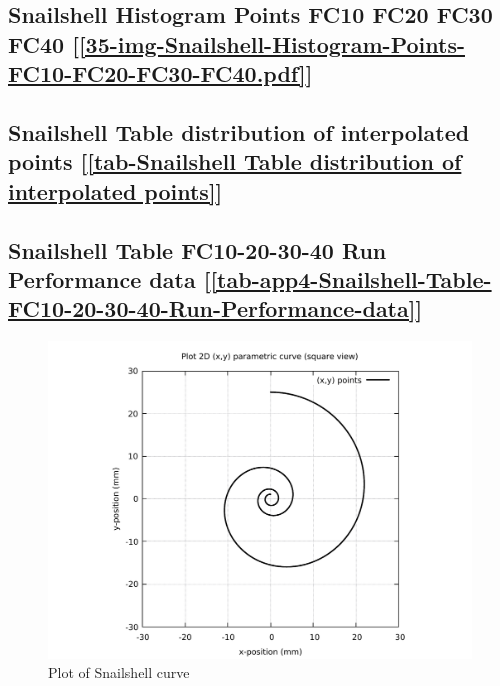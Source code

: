 \subsection       {Snailshell Histogram Points FC10 FC20 FC30 FC40
	[\ref      {35-img-Snailshell-Histogram-Points-FC10-FC20-FC30-FC40.pdf}] }
\label{ssec-35-img-Snailshell-Histogram-Points-FC10-FC20-FC30-FC40.pdf}

\subsection    {Snailshell Table distribution of interpolated points
	[\ref      {tab-Snailshell Table distribution of interpolated points}] }
\label{ssec-tab-Snailshell Table distribution of interpolated points}

\subsection         {Snailshell Table FC10-20-30-40 Run Performance data
	[\ref      {tab-app4-Snailshell-Table-FC10-20-30-40-Run-Performance-data}] }
\label{ssec-tab-app4-Snailshell-Table-FC10-20-30-40-Run-Performance-data}


\clearpage
\pagebreak

\begin{figure}
	\caption     {Plot of Snailshell curve}
	\label{01-img-Plot of Snailshell curve.pdf}
	\includegraphics[width=1.00\textwidth]{Chap4/appendix/app-Snailshell/plots/01-img-Plot of Snailshell curve.pdf}
\end{figure}	


